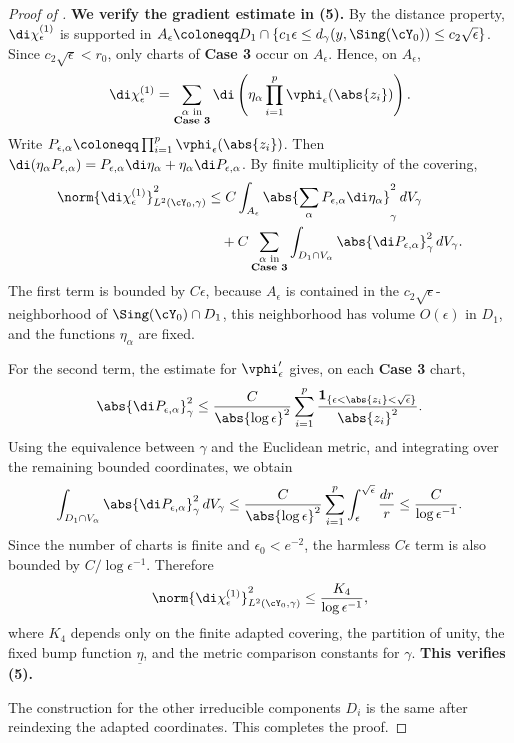 \documentclass[12pt]{amsart}
\begin{document}
\begin{proof}[Proof of ]
    \textbf{We verify the gradient estimate in (5).}
    By the distance property, $\di\chi^{(1)}_\epsilon$ is supported in
    $A_\epsilon\coloneqq D_1\cap
    \{c_1\epsilon\leq d_\gamma(y,\Sing(\cY_0))\leq c_2\sqrt{\epsilon}\}$.
    Since $c_2\sqrt{\epsilon}<r_0$, only charts of \textbf{Case 3} occur on
    $A_\epsilon$. Hence, on $A_\epsilon$,
    \[
    \di\chi^{(1)}_\epsilon
    =
    \sum_{\substack{\alpha\text{ in}\\\textbf{Case 3}}}
    \di\left(\eta_\alpha\prod_{i=1}^p\vphi_\epsilon(\abs{z_i})\right).
    \]
    Write $P_{\epsilon,\alpha}\coloneqq
    \prod_{i=1}^p\vphi_\epsilon(\abs{z_i})$. Then
    $\di(\eta_\alpha P_{\epsilon,\alpha})
    =P_{\epsilon,\alpha}\di\eta_\alpha+\eta_\alpha\di P_{\epsilon,\alpha}$.
    By finite multiplicity of the covering,
    \[
    \begin{aligned}
        \norm{\di\chi^{(1)}_\epsilon}_{L^2(\cY_0,\gamma)}^2
        &\leq
        C\int_{A_\epsilon}
        \abs{\sum_{\alpha}P_{\epsilon,\alpha}\di\eta_\alpha}_\gamma^2
        \,dV_\gamma  \\
        &\quad+
        C\sum_{\substack{\alpha\text{ in}\\\textbf{Case 3}}}
        \int_{D_1\cap V_\alpha}\abs{\di P_{\epsilon,\alpha}}_\gamma^2
        \,dV_\gamma .
    \end{aligned}
    \]
    The first term is bounded by $C\epsilon$, because $A_\epsilon$ is
    contained in the $c_2\sqrt{\epsilon}$-neighborhood of
    $\Sing(\cY_0)\cap D_1$, this neighborhood has volume $O(\epsilon)$ in
    $D_1$, and the functions $\eta_\alpha$ are fixed.

    For the second term, the estimate for $\vphi_\epsilon'$ gives, on each
    \textbf{Case 3} chart,
    \[
        \abs{\di P_{\epsilon,\alpha}}_\gamma^2
        \leq
        \frac{C}{\abs{\log\epsilon}^2}
        \sum_{i=1}^p
        \frac{\mathbf{1}_{\{\epsilon<\abs{z_i}<\sqrt{\epsilon}\}}}
        {\abs{z_i}^2}.
    \]
    Using the equivalence between $\gamma$ and the Euclidean metric, and
    integrating over the remaining bounded coordinates, we obtain
    \[
        \int_{D_1\cap V_\alpha}
        \abs{\di P_{\epsilon,\alpha}}_\gamma^2\,dV_\gamma
        \leq
        \frac{C}{\abs{\log\epsilon}^2}
        \sum_{i=1}^p\int_\epsilon^{\sqrt{\epsilon}}\frac{dr}{r}
        \leq
        \frac{C}{\log\epsilon^{-1}}.
    \]
    Since the number of charts is finite and $\epsilon_0<e^{-2}$, the
    harmless $C\epsilon$ term is also bounded by $C/\log\epsilon^{-1}$.
    Therefore
    \[
        \norm{\di\chi^{(1)}_\epsilon}_{L^2(\cY_0,\gamma)}^2
        \leq
        \frac{K_4}{\log\epsilon^{-1}},
    \]
    where $K_4$ depends only on the finite adapted covering, the partition
    of unity, the fixed bump function $\underline{\eta}$, and the metric
    comparison constants for $\gamma$. \textbf{This verifies (5).}

    The construction for the other irreducible components $D_i$ is the same
    after reindexing the adapted coordinates. This completes the proof.
\end{proof}
\end{document}
